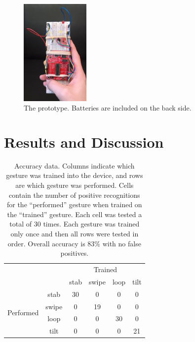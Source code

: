 \documentclass[12pt]{article}
\begin{document}
\begin{figure}[h!]
  \begin{center}
    \includegraphics[width=0.3\textwidth]{device-original.jpg}
  \caption{The prototype. Batteries are included on the back side.}
  \end{center}
\end{figure}

\section{Results and Discussion}

\begin{table}[h!]
\begin{center}
    \begin{tabular}{cc|cccc}
    & & \multicolumn{4}{c}{Trained} \\
    & & stab & swipe & loop & tilt \\
    \hline
    \multirow{4}{*}{Performed} & stab & 30 & 0 & 0 & 0  \\
    & swipe & 0 & 19 & 0 & 0 \\
    & loop & 0 & 0 & 30 & 0 \\
    & tilt & 0 & 0 & 0 & 21
    \end{tabular}
    \caption{Accuracy data. Columns indicate which gesture was
    trained into the device, and rows are which gesture was performed. Cells
    contain the number of positive recognitions for the ``performed'' gesture
    when trained on the ``trained'' gesture. Each
    cell was tested a total of 30 times. Each gesture was trained only once
    and then all rows were tested in order. Overall accuracy is 83\% with no
    false positives.}
    \label{tbl:data}
\end{center}
\end{table}
\end{document}
